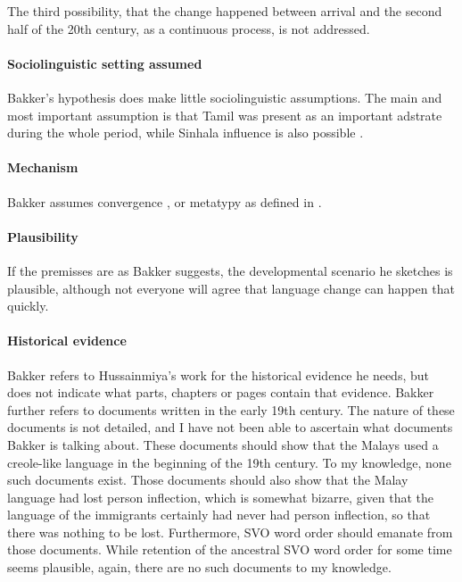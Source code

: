 The third possibility, that the change happened between arrival and the second half of the 20th century, as a continuous process, is not addressed.

\paragraph{Sociolinguistic setting assumed}
Bakker's hypothesis does make little sociolinguistic assumptions. The main and most important assumption is that Tamil was present as an important adstrate during the whole period, while Sinhala influence is also possible \citep[46]{Bakker1995nl}.

\paragraph{Mechanism}
Bakker assumes convergence \citep{abc}, or metatypy as defined in \citet{Foley1986, Ross1996, Ross2001}.

\paragraph{Plausibility} If the premisses are as Bakker suggests, the developmental scenario he sketches is plausible, although not everyone will agree that language change can happen that quickly.

\paragraph{Historical evidence}
Bakker refers to Hussainmiya's work for the historical evidence he needs, but does not indicate what parts, chapters or pages contain that evidence. Bakker further refers to documents written in the early 19th century. The nature of these documents is not detailed, and I have not been able to ascertain what documents Bakker is talking about. These documents should show that the Malays used a creole-like language in the beginning of the 19th century. To my knowledge, none such documents exist. Those documents should also show that the Malay language had lost person inflection, which is somewhat bizarre, given that the language of the immigrants certainly had never had person inflection, so that there was nothing to be lost. Furthermore, SVO word order should emanate from those documents. While retention of the ancestral SVO word order for some time seems plausible, again, there are no such documents to my knowledge.

